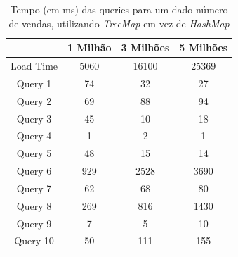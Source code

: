 \documentclass[a4paper]{report}
\begin{document}
\begin{table}[H]
    \begin{center}
        \begin{tabular}{| c | c | c | c |}
            \hline
            & 1 Milhão & 3 Milhões & 5 Milhões \\
            \hline
            Load Time & 5060 & 16100 & 25369 \\
            \hline
            Query 1 & 74 & 32 & 27 \\
            \hline
            Query 2 & 69 & 88 & 94 \\
            \hline
            Query 3 & 45 & 10 & 18 \\
            \hline
            Query 4 & 1 & 2 & 1 \\
            \hline
            Query 5 & 48 & 15 & 14 \\
            \hline
            Query 6 & 929 & 2528 & 3690 \\
            \hline
            Query 7 & 62 & 68 & 80 \\
            \hline
            Query 8 & 269 & 816 & 1430 \\
            \hline
            Query 9 & 7 & 5 & 10 \\
            \hline
            Query 10 & 50 & 111 & 155 \\
            \hline

        \end{tabular}
        \caption{Tempo (em ms) das queries para um dado número de vendas, utilizando
        \textit{TreeMap} em vez de \textit{HashMap}}
        \label{tab:benchesTH}
    \end{center}
\end{table}
\end{document}
